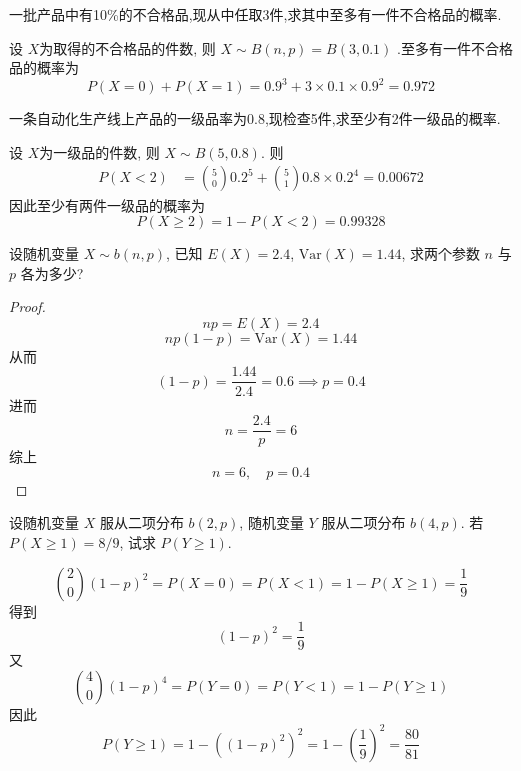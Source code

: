 \documentclass[../main.tex]{subfiles}
\begin{document}
\begin{exercise}{}{}
一批产品中有10\%的不合格品,现从中任取3件,求其中至多有一件不合格品的概率.
\end{exercise}
\begin{solution}
     设 \(  X  \)为取得的不合格品的件数, 则  \(  X\sim B\left( n,p \right)=   B\left( 3, 0.1 \right)   \) .至多有一件不合格品的概率为 \[
    P\left( X= 0 \right)+ P\left( X= 1 \right)=  0.9^{3}+ 3 \times 0.1\times 0.9^{2}= 0.972
    \]
\end{solution}

\begin{exercise}{}{}
一条自动化生产线上产品的一级品率为0.8,现检查5件,求至少有2件一级品的概率.
\end{exercise}
\begin{solution}
    设 \(  X  \)为一级品的件数, 则 \(  X\sim  B\left( 5, 0.8 \right)    \). 则 \[
   \begin{aligned}
    P\left( X<  2 \right)&=\binom{ 5 }{0  } 0.2^{5}+ \binom{ 5 }{1  }0.8\times 0.2^{4}=0.00672
   \end{aligned}
    \]因此至少有两件一级品的概率为 \[
    P\left( X\ge 2 \right)= 1-P\left( X< 2 \right)= 0.99328
    \]
\end{solution}

\begin{exercise}{}{}
设随机变量 $X \sim b(n,p)$, 已知 $E(X) = 2.4$, $\mathrm{Var}(X) = 1.44$, 求两个参数 $n$ 与 $p$ 各为多少?
\end{exercise}
\begin{proof}
     \[
    np= E\left( X \right)= 2.4 
     \] \[
     np\left( 1-p \right)= \mathrm{Var}\left( X \right)=  1.44 
     \]从而 \[
     \left( 1-p \right)= \frac{1.44 }{2.4 }= 0.6\implies p= 0.4  
     \]进而  \[
     n = \frac{2.4 }{p }= 6 
     \]综上 \[
     n = 6,\quad p= 0.4
     \]
\end{proof}
\begin{exercise}{}{}
设随机变量 $X$ 服从二项分布 $b(2,p)$, 随机变量 $Y$ 服从二项分布 $b(4,p)$. 若 $P(X \geqslant 1) = 8/9$, 试求 $P(Y \geqslant 1)$.
\end{exercise}
\begin{solution}
      \[
     \binom{ 2 }{0  }\left( 1-p \right)^{2}= P\left( X= 0 \right)=    P\left( X< 1 \right)= 1-P\left( X\ge  1 \right)= \frac{1 }{9 }   
     \]得到 \[
     \left( 1-p \right)^{2}= \frac{1 }{9 }  
     \]又\[
     \binom{ 4 }{0  } \left( 1-p \right)^{4}=P\left( Y= 0 \right)=   P\left( Y< 1 \right)= 1-P\left( Y\ge 1 \right)   
     \] 因此 \[
     P\left( Y\ge 1 \right)=1- \left( \left( 1-p \right)^{2}  \right)^{2}= 1- \left( \frac{1 }{9 }  \right)^{2}= \frac{80 }{81 }   
     \]
\end{solution}
\end{document}
